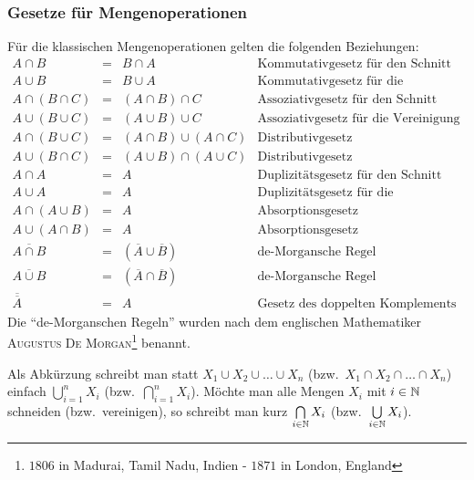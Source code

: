 \subsubsection{Gesetze für Mengenoperationen}
\label{SetOpSect}
Für die klassischen Mengenoperationen gelten die folgenden Beziehungen:
\begin{displaymath}
\begin{array}{rcll}
A \cap B &=& B \cap A & \text{Kommutativgesetz für den Schnitt}\\
A \cup B &=& B \cup A & \text{Kommutativgesetz für die Vereinigung}\\
A \cap (B \cap C) &=& (A \cap B) \cap C & \text{Assoziativgesetz für
den Schnitt}\\
A \cup (B \cup C) &=& (A \cup B) \cup C & \text{Assoziativgesetz für
die Vereinigung}\\
A \cap (B \cup C) &=& (A \cap B) \cup (A \cap C) & \text{Distributivgesetz}\\
A \cup (B \cap C) &=& (A \cup B) \cap (A \cup C) & \text{Distributivgesetz}\\
A \cap A &=& A & \text{Duplizitätsgesetz für den Schnitt}\\
A \cup A &=& A & \text{Duplizitätsgesetz für die Vereinigung}\\
A \cap (A \cup B) &=& A & \text{Absorptionsgesetz}\\
A \cup (A \cap B) &=& A & \text{Absorptionsgesetz}\\
\overline{A \cap B} &=& (\overline{A} \cup \overline{B}) &
\text{de-Morgansche Regel}\\
\overline{A \cup B} &=& (\overline{A} \cap \overline{B}) &
\text{de-Morgansche Regel}\\
\overline{\overline{A}} &=& A & \text{Gesetz des doppelten Komplements}
\end{array}
\end{displaymath}
Die "`de-Morganschen Regeln"' wurden nach dem englischen
Mathematiker \textsc{Augustus De Morgan}\footnote{\textborn $1806$ in
Madurai, Tamil Nadu, Indien - \textdied $1871$ in London, England}
benannt.

Als Abkürzung schreibt man statt $X_1 \cup X_2 \cup \dots \cup X_n$
(bzw.~$X_1 \cap X_2 \cap \dots \cap X_n$) einfach $\bigcup\limits_{i=1}^n X_i$
(bzw.~$\bigcap\limits_{i=1}^n X_i$). Möchte man alle Mengen $X_i$ mit
$i \in \mathbb N$ schneiden (bzw.~vereinigen), so schreibt man kurz
$\bigcap\limits_{i \in \mathbb N} X_i$ (bzw.~$\bigcup\limits_{i \in \mathbb N} X_i$).

\goodbreak

